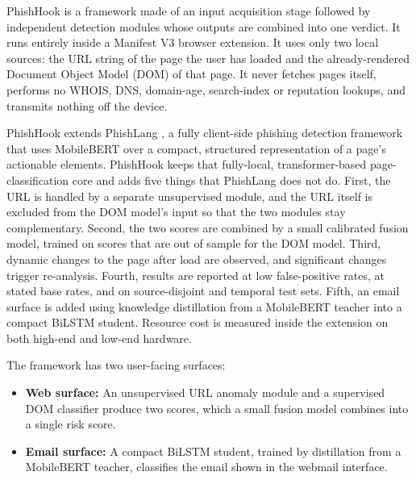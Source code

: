 \documentclass{FastFyp}
\begin{document}
PhishHook is a framework made of an input acquisition stage followed by independent detection modules whose outputs are combined into one verdict. It runs entirely inside a Manifest V3 browser extension. It uses only two local sources: the URL string of the page the user has loaded and the already-rendered Document Object Model (DOM) of that page. It never fetches pages itself, performs no WHOIS, DNS, domain-age, search-index or reputation lookups, and transmits nothing off the device.

PhishHook extends PhishLang \cite{phishlang2026}, a fully client-side phishing detection framework that uses MobileBERT over a compact, structured representation of a page's actionable elements. PhishHook keeps that fully-local, transformer-based page-classification core and adds five things that PhishLang does not do. First, the URL is handled by a separate unsupervised module, and the URL itself is excluded from the DOM model's input so that the two modules stay complementary. Second, the two scores are combined by a small calibrated fusion model, trained on scores that are out of sample for the DOM model. Third, dynamic changes to the page after load are observed, and significant changes trigger re-analysis. Fourth, results are reported at low false-positive rates, at stated base rates, and on source-disjoint and temporal test sets. Fifth, an email surface is added using knowledge distillation from a MobileBERT teacher into a compact BiLSTM student. Resource cost is measured inside the extension on both high-end and low-end hardware.

The framework has two user-facing surfaces:
\begin{itemize}
    \item \textbf{Web surface:} An unsupervised URL anomaly module and a supervised DOM classifier produce two scores, which a small fusion model combines into a single risk score.
    \item \textbf{Email surface:} A compact BiLSTM student, trained by distillation from a MobileBERT teacher, classifies the email shown in the webmail interface.
\end{itemize}
\end{document}
